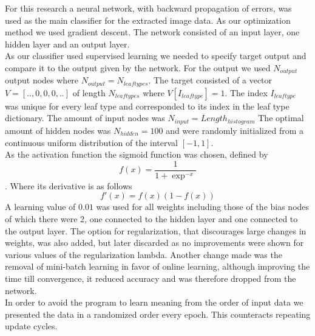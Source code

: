 \documentclass{article}
\begin{document}
For this research a neural network, with backward propagation of errors, was used as the main classifier for the extracted image data. As our optimization method we used gradient descent. The network consisted of an input layer, one hidden layer and an output layer.\\
As our classifier used supervised learning we needed to specify target output and compare it to the output given by the network. For the output we used $N_{output}$ output nodes where $N_{output}=N_{leaftypes}$. The target consisted of a vector $V=[..,0,0,0,..]$ of length $N_{leaftypes}$ where $V[I_{leaftype}]=1$. The index $I_{leaftype}$ was unique for every leaf type and corresponded to its index in the leaf type dictionary. The amount of input nodes was $N_{input}=Length_{histogram}$ The optimal amount of hidden nodes was $N_{hidden}=100$ and were randomly initialized from a continuous uniform distribution of the interval $[-1, 1]$.\\
As the activation function the sigmoid function was chosen, defined by $$f(x)=\frac{1}{1+\exp^{-x}}$$.
Where its derivative is as follows
$$f'(x)=f(x)(1-f(x))$$
A learning value of $0.01$ was used for all weights including those of the bias nodes of which there were 2, one connected to the hidden layer and one connected to the output layer. The option for regularization, that discourages large changes in weights, was also added, but later discarded as no improvements were shown for various values of the regularization lambda. Another change made was the removal of mini-batch learning in favor of online learning, although improving the time till convergence, it reduced accuracy and was therefore dropped from the network.\\
In order to avoid the program to learn meaning from the order of input data we presented the data in a randomized order every epoch. This counteracts repeating update cycles.
\end{document}

